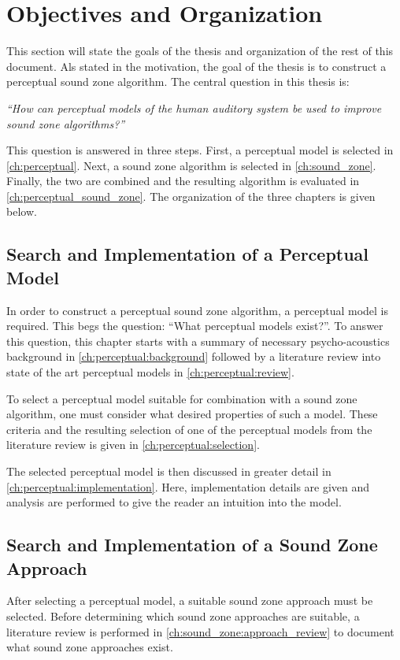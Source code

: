 \section{Objectives and Organization}
\label{ch:introduction:objectives}
This section will state the goals of the thesis and organization of the rest of this document.
Als stated in the motivation, the goal of the thesis is to construct a perceptual sound zone algorithm.
The central question in this thesis is: 

{\centering\textit{``How can perceptual models of the human auditory system be used to improve sound zone algorithms?''}}

This question is answered in three steps. 
First, a perceptual model is selected in \autoref{ch:perceptual}.
Next, a sound zone algorithm is selected in \autoref{ch:sound_zone}.
Finally, the two are combined and the resulting algorithm is evaluated in \autoref{ch:perceptual_sound_zone}.
The organization of the three chapters is given below.

\subsection{Search and Implementation of a Perceptual Model}
\label{ch:introduction:objectives:perceptual}
In order to construct a perceptual sound zone algorithm, a perceptual model is required.
This begs the question: ``What perceptual models exist?''.
To answer this question, this chapter starts with a summary of necessary psycho-acoustics background in 
\autoref{ch:perceptual:background} followed by a literature review into state of the art perceptual models
in \autoref{ch:perceptual:review}.

To select a perceptual model suitable for combination with a sound zone algorithm, one must consider what 
desired properties of such a model.
These criteria and the resulting selection of one of the perceptual models from the 
literature review is given in \autoref{ch:perceptual:selection}.

The selected perceptual model is then discussed in greater detail in \autoref{ch:perceptual:implementation}. 
Here, implementation details are given and analysis are performed to give the reader an intuition into the model.

\subsection{Search and Implementation of a Sound Zone Approach}
\label{ch:introduction:objectives:sound_zone}
After selecting a perceptual model, a suitable sound zone approach must be selected.
Before determining which sound zone approaches are suitable, a literature review is performed in
\autoref{ch:sound_zone:approach_review} to document what sound zone approaches exist.

